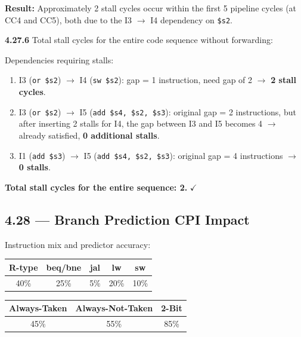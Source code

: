 \textbf{Result:} Approximately 2 stall cycles occur within the first 5
pipeline cycles (at CC4 and CC5), both due to the I3 $\to$ I4 dependency on
\texttt{\$s2}.

\medskip\noindent\textbf{4.27.6}
Total stall cycles for the entire code sequence without forwarding:

Dependencies requiring stalls:
\begin{enumerate}
  \item I3 (\texttt{or \$s2}) $\to$ I4 (\texttt{sw \$s2}): gap = 1 instruction,
    need gap of 2 $\to$ \textbf{2 stall cycles}.
  \item I3 (\texttt{or \$s2}) $\to$ I5 (\texttt{add \$s4, \$s2, \$s3}): original
    gap = 2 instructions, but after inserting 2 stalls for I4, the gap between
    I3 and I5 becomes 4 $\to$ already satisfied, \textbf{0 additional stalls}.
  \item I1 (\texttt{add \$s3}) $\to$ I5 (\texttt{add \$s4, \$s2, \$s3}): original
    gap = 4 instructions $\to$ \textbf{0 stalls}.
\end{enumerate}

\textbf{Total stall cycles for the entire sequence: 2.} $\checkmark$

\subsection*{4.28 --- Branch Prediction CPI Impact}
\hypertarget{sol-4.28}{}

Instruction mix and predictor accuracy:

\begin{center}
\begin{tabular}{ccccc}
\toprule
\textbf{R-type} & \textbf{beq/bne} & \textbf{jal} & \textbf{lw} &
\textbf{sw} \\
\midrule
40\% & 25\% & 5\% & 20\% & 10\% \\
\bottomrule
\end{tabular}
\end{center}

\begin{center}
\begin{tabular}{ccc}
\toprule
\textbf{Always-Taken} & \textbf{Always-Not-Taken} & \textbf{2-Bit} \\
\midrule
45\% & 55\% & 85\% \\
\bottomrule
\end{tabular}
\end{center}

